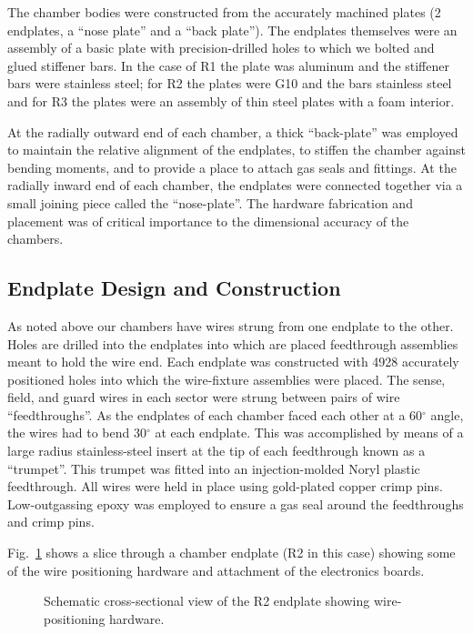 The chamber bodies were constructed from the accurately machined plates
(2 endplates, a ``nose plate'' and a ``back plate'').
The endplates themselves were an assembly of a basic plate with precision-drilled
holes to which we bolted and glued stiffener bars.  In the case of
R1 the plate was aluminum and the stiffener bars were stainless steel;
for R2 the plates were G10 and the bars stainless steel and for R3
the plates were an assembly of thin steel plates with a foam interior.

At the radially outward end of each chamber, a thick ``back-plate'' was 
employed to maintain the relative 
alignment of the endplates, to stiffen the chamber against bending moments, 
and to provide a place to attach gas seals and fittings. At the radially inward 
end of each chamber, the endplates were connected together via a small joining 
piece called the ``nose-plate''.  The hardware fabrication and placement 
was of critical importance to the dimensional accuracy of the chambers.

\subsection{Endplate Design and Construction}

As noted above our chambers have wires strung from one endplate to 
the other.  Holes are drilled into the endplates into which are
placed feedthrough assemblies meant to hold the wire end.
Each endplate was constructed with 4928 accurately positioned holes into 
which the 
wire-fixture assemblies were placed.  The sense, field, and guard wires in each 
sector were strung between pairs of wire ``feedthroughs''.  As the endplates of 
each chamber faced each other at a 60$^{\circ}$ angle, the wires had to bend 
30$^{\circ}$ at each endplate.  This was accomplished by means of a large radius 
stainless-steel insert at the tip of each feedthrough known as a ``trumpet''.
This trumpet was fitted into an injection-molded Noryl plastic feedthrough.  
All wires were held in place using gold-plated copper crimp pins.  
Low-outgassing epoxy was employed to ensure a gas seal around the feedthroughs 
and crimp pins.  

Fig.~\ref{dc-corner} shows a slice through a chamber endplate (R2 in this case)
showing some of the wire positioning hardware and attachment of the electronics 
boards.
\begin{figure}[htpb]   
\vspace{8cm}Schematic cross-sectional view of the R2 endplate showing
wire-positioning hardware.
\caption{\small{}}
\label{dc-corner}
\end{figure}   



